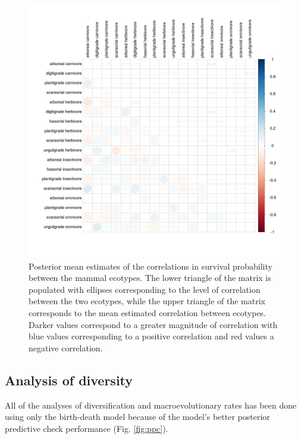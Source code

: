 \documentclass[12pt,letterpaper]{article}
\begin{document}
\begin{figure}[ht]
  \centering
  \includegraphics[width=\textwidth,height=\textheight,keepaspectratio=true]{figure/survival_correlation}
  \caption[Estimated correlations in survival probability between ecotypes]{Posterior mean estimates of the correlations in survival probability between the mammal ecotypes. The lower triangle of the matrix is populated with ellipses corresponding to the level of correlation between the two ecotypes, while the upper triangle of the matrix corresponds to the mean estimated correlation between ecotypes. Darker values correspond to a greater magnitude of correlation with blue values corresponding to a positive correlation and red values a negative correlation.}
  \label{fig:survival_corr}
\end{figure}







\subsection*{Analysis of diversity}

All of the analyses of diversification and macroevolutionary rates has been done using only the birth-death model because of the model's better posterior predictive check performance (Fig. \ref{fig:ppc}).
\end{document}
